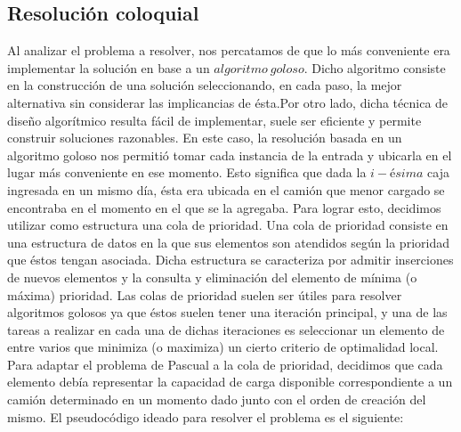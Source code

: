 \subsection{Resolución coloquial}
Al analizar el problema a resolver, nos percatamos de que lo más conveniente era implementar la solución en base a un $algoritmo\ goloso$. Dicho algoritmo consiste en la construcción de una solución seleccionando, en cada paso, la mejor alternativa sin considerar las implicancias de ésta.\newline Por otro lado, dicha técnica de diseño algorítmico resulta fácil de implementar, suele ser eficiente y permite construir soluciones razonables.\newline
\newline
En este caso, la resolución basada en un algoritmo goloso nos permitió tomar cada instancia de la entrada y ubicarla en el lugar más conveniente en ese momento. Esto significa que dada la $i-ésima$ caja ingresada en un mismo día, ésta era ubicada en el camión que menor cargado se encontraba en el momento en el que se la agregaba. Para lograr esto, decidimos utilizar como estructura una cola de prioridad.\newline
\newline
Una cola de prioridad consiste en una estructura de datos en la que sus elementos son atendidos según la prioridad que éstos tengan asociada. Dicha estructura se caracteriza por admitir inserciones de nuevos elementos y la consulta y eliminación del elemento de mínima (o máxima) prioridad.\newline
Las colas de prioridad suelen ser útiles para resolver algoritmos golosos ya que éstos suelen tener una iteración principal, y una de las tareas a realizar en cada una de dichas iteraciones es seleccionar un elemento de entre varios que minimiza (o maximiza) un cierto criterio de optimalidad local.\newline
Para adaptar el problema de Pascual a la cola de prioridad, decidimos que cada elemento debía representar la capacidad de carga disponible correspondiente a un camión determinado en un momento dado junto con el orden de creación del mismo.\newline
\newline
El pseudocódigo ideado para resolver el problema es el siguiente:\newline

